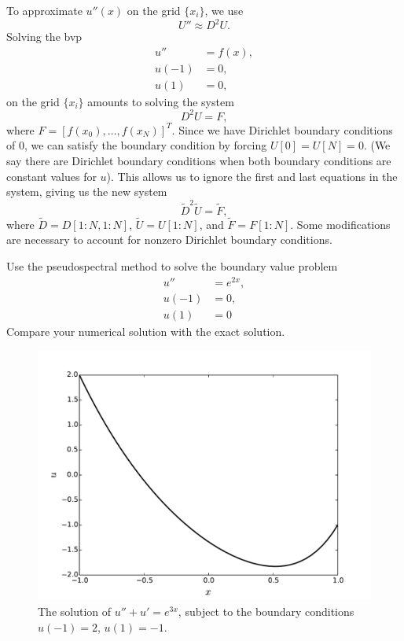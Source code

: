 To approximate $u''(x)$ on the grid $\{x_i\}$, we use 
\[U'' \approx D^2 U.\]
Solving the bvp
\begin{align*}
u'' &= f(x), \\
u(-1) &= 0, \\
u(1) &= 0,
\end{align*}
on the grid $\{x_i\}$ amounts to solving the system 
\[D^2 U = F,\]
where $F = [f(x_0),\ldots, f(x_N)]^T$.
Since we have Dirichlet boundary conditions of $0$, we can satisfy the boundary condition by forcing $U[0] = U[N] = 0$.
(We say there are Dirichlet boundary conditions when both boundary conditions are constant values for $u$).
This allows us to ignore the first and last equations in the system, giving us the new system 
\[\tilde{D}^2 \tilde{U} = \tilde{F},\]
where $\tilde{D} = D[1:N,1:N]$, $\tilde{U} = U[1:N]$, and $\tilde{F} = F[1:N]$.
Some modifications are necessary to account for nonzero Dirichlet boundary conditions.

\begin{problem}
Use the pseudospectral method to solve the boundary value problem 
\begin{align*}
u'' &= e^{2x}, \\
u(-1) &= 0, \\
u(1) &= 0
\end{align*}
Compare your numerical solution with the exact solution.
\end{problem}

\begin{figure}[ht]
\centering
\includegraphics[width=12cm]{nonzeroDirichlet.pdf}
\caption{The solution of $u'' + u' = e^{3x}$, subject to the boundary conditions 
$u(-1) = 2$, $u(1) = -1$.}
\label{fig:nonzeroDirichlet}
\end{figure}

